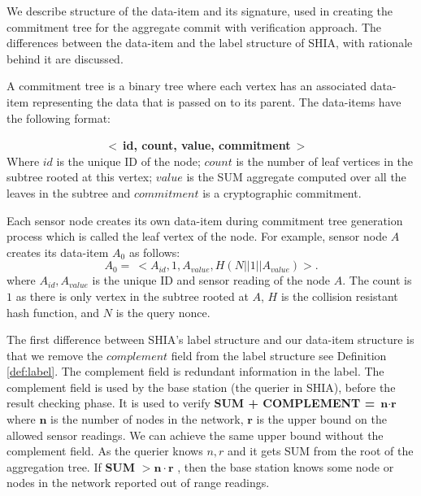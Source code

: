 	We describe structure of the data-item and its signature, used in creating the commitment tree for the aggregate commit with verification approach. 
	The differences between the data-item and the label structure of SHIA, with rationale behind it are discussed.
	\begin{definition}
		\label{def:data-item}
		A commitment tree is a binary tree where each vertex has an associated data-item representing the data that is passed on to its parent. The data-items have the following format:

		$\hspace{100pt}$ \textbf{$<\ $id, count, value, commitment$\ >$}\\
		Where $id$ is the unique ID of the node; $count$ is the number of leaf vertices in the subtree rooted at this vertex; $value$ is the SUM aggregate computed over all the leaves in the subtree and $commitment$ is a cryptographic commitment.
	\end{definition}
	Each sensor node creates its own data-item during commitment tree generation process which is called the leaf vertex of the node.
	For example, sensor node $A$ creates its data-item $A_{0}$ as follows:
	\begin{equation}
		\label{eq:data-item}
	 	A_{0} =\ <A_{id}, 1, A_{value}, H(N||1||A_{value})>.
	\end{equation}
	where $A_{id}, A_{value}$ is the unique ID and sensor reading of the node $A$. 
	The count is $1$ as there is only vertex in the subtree rooted at $A$, $H$ is the collision resistant hash function, and $N$ is the query nonce.

	The first difference between SHIA's label structure and our data-item structure is that we remove the $complement$ field from the label structure see Definition \ref{def:label}. 
	The complement field is redundant information in the label. 
	The complement field is used by the base station (the querier in SHIA), before the result checking phase.
	It is used to verify \textbf{SUM + COMPLEMENT =} $\textbf{n} \cdot \textbf{r}$ where $\textbf{n}$ is the number of nodes in the network, $\textbf{r}$ is the upper bound on the allowed sensor readings.
	We can achieve the same upper bound without the complement field.
	As the querier knows $n, r$ and it gets SUM from the root of the aggregation tree.
	If \textbf{SUM} $> \textbf{n} \cdot \textbf{r}$ , then the base station knows some node or nodes in the network reported out of range readings.

